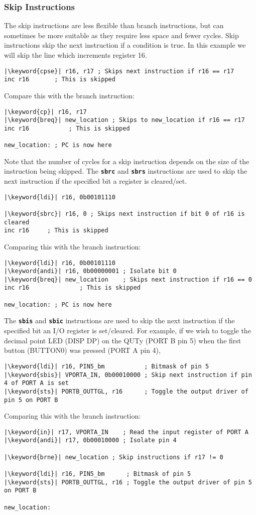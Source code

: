\documentclass{article}
\newcommand{\keyword}[1]{\textcolor[rgb]{0.00,0.50,0.00}{\textbf{#1}}}
\newcommand{\keywordinline}[1]{\textcolor[rgb]{0.00,0.50,0.00}{\textbf{\texttt{#1}}}}
\begin{document}
\subsubsection{Skip Instructions}
The skip instructions are less flexible than branch instructions, but
can sometimes be more suitable as they require less space and fewer
cycles. Skip instructions skip the next instruction if a condition is
true. In this example we will skip the line which increments register
16.
\begin{verbatim}
|\keyword{cpse}| r16, r17 ; Skips next instruction if r16 == r17
inc r16       ; This is skipped
\end{verbatim}
Compare this with the branch instruction:
\begin{verbatim}
|\keyword{cp}| r16, r17
|\keyword{breq}| new_location ; Skips to new_location if r16 == r17
inc r16           ; This is skipped

new_location: ; PC is now here
\end{verbatim}
Note that the number of cycles for a skip instruction depends on the
size of the instruction being skipped. The \keywordinline{sbrc} and
\keywordinline{sbrs} instructions are used to skip the next instruction
if the specified bit a register is cleared/set.
\begin{verbatim}
|\keyword{ldi}| r16, 0b00101110

|\keyword{sbrc}| r16, 0 ; Skips next instruction if bit 0 of r16 is cleared
inc r16     ; This is skipped
\end{verbatim}
Comparing this with the branch instruction:
\begin{verbatim}
|\keyword{ldi}| r16, 0b00101110
|\keyword{andi}| r16, 0b00000001 ; Isolate bit 0
|\keyword{breq}| new_location    ; Skips next instruction if r16 == 0
inc r16              ; This is skipped

new_location: ; PC is now here
\end{verbatim}
The \keywordinline{sbis} and \keywordinline{sbic} instructions are used
to skip the next instruction if the specified bit an I/O register is
set/cleared. For example, if we wish to toggle the decimal point LED
(DISP DP) on the QUTy (PORT B pin 5) when the first button (BUTTON0)
was pressed (PORT A pin 4),
\begin{verbatim}
|\keyword{ldi}| r16, PIN5_bm           ; Bitmask of pin 5
|\keyword{sbis}| VPORTA_IN, 0b00010000 ; Skip next instruction if pin 4 of PORT A is set
|\keyword{sts}| PORTB_OUTTGL, r16      ; Toggle the output driver of pin 5 on PORT B
\end{verbatim}
Comparing this with the branch instruction:
\begin{verbatim}
|\keyword{in}| r17, VPORTA_IN    ; Read the input register of PORT A
|\keyword{andi}| r17, 0b00010000 ; Isolate pin 4

|\keyword{brne}| new_location ; Skip instructions if r17 != 0

|\keyword{ldi}| r16, PIN5_bm      ; Bitmask of pin 5
|\keyword{sts}| PORTB_OUTTGL, r16 ; Toggle the output driver of pin 5 on PORT B

new_location:
\end{verbatim}
\end{document}
